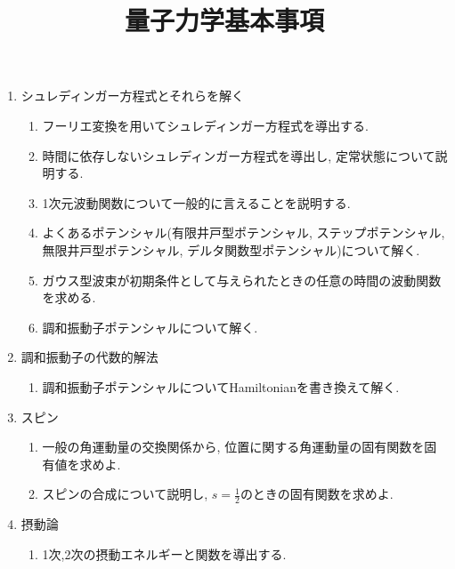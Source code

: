 \documentclass[11pt,a4paper]{jarticle}
\title{量子力学基本事項}
\author{}
\date{}
\begin{document}
\maketitle
\begin{enumerate}
    \item シュレディンガー方程式とそれらを解く
    \begin{enumerate}
        \item フーリエ変換を用いてシュレディンガー方程式を導出する.
        \item 時間に依存しないシュレディンガー方程式を導出し, 定常状態について説明する.
        \item 1次元波動関数について一般的に言えることを説明する.
        \item よくあるポテンシャル(有限井戸型ポテンシャル, ステップポテンシャル, 無限井戸型ポテンシャル, デルタ関数型ポテンシャル)について解く.
        \item ガウス型波束が初期条件として与えられたときの任意の時間の波動関数を求める.
        \item 調和振動子ポテンシャルについて解く.
    \end{enumerate}
    \item 調和振動子の代数的解法
    \begin{enumerate}
        \item 調和振動子ポテンシャルについてHamiltonianを書き換えて解く.
    \end{enumerate}
    \item スピン
    \begin{enumerate}
        \item 一般の角運動量の交換関係から, 位置に関する角運動量の固有関数を固有値を求めよ.
        \item スピンの合成について説明し, $s=\frac{1}{2}$のときの固有関数を求めよ.
    \end{enumerate}
    \item 摂動論
    \begin{enumerate}
        \item 1次,2次の摂動エネルギーと関数を導出する.
    \end{enumerate}
\end{enumerate}
\end{document}
